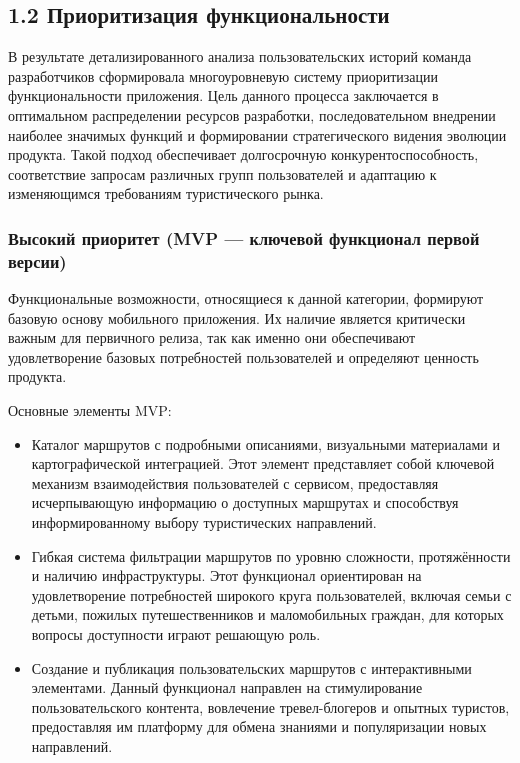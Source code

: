 \subsection*{1.2 Приоритизация функциональности}

В результате детализированного анализа пользовательских историй команда разработчиков сформировала многоуровневую систему приоритизации функциональности приложения. Цель данного процесса заключается в оптимальном распределении ресурсов разработки, последовательном внедрении наиболее значимых функций и формировании стратегического видения эволюции продукта. Такой подход обеспечивает долгосрочную конкурентоспособность, соответствие запросам различных групп пользователей и адаптацию к изменяющимся требованиям туристического рынка.

\subsubsection*{Высокий приоритет (MVP — ключевой функционал первой версии)}
Функциональные возможности, относящиеся к данной категории, формируют базовую основу мобильного приложения. Их наличие является критически важным для первичного релиза, так как именно они обеспечивают удовлетворение базовых потребностей пользователей и определяют ценность продукта.

Основные элементы MVP:
\begin{itemize}
    \item 	Каталог маршрутов с подробными описаниями, визуальными материалами и картографической интеграцией. Этот элемент представляет собой ключевой механизм взаимодействия пользователей с сервисом, предоставляя исчерпывающую информацию о доступных маршрутах и способствуя информированному выбору туристических направлений.
    \item 	Гибкая система фильтрации маршрутов по уровню сложности, протяжённости и наличию инфраструктуры. Этот функционал ориентирован на удовлетворение потребностей широкого круга пользователей, включая семьи с детьми, пожилых путешественников и маломобильных граждан, для которых вопросы доступности играют решающую роль.
    \item 	Создание и публикация пользовательских маршрутов с интерактивными элементами. Данный функционал направлен на стимулирование пользовательского контента, вовлечение тревел-блогеров и опытных туристов, предоставляя им платформу для обмена знаниями и популяризации новых направлений.
\end{itemize}


